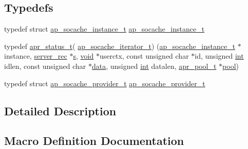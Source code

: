 \subsection*{Typedefs}
\begin{DoxyCompactItemize}
\item 
typedef struct \hyperlink{structap__socache__instance__t}{ap\+\_\+socache\+\_\+instance\+\_\+t} \hyperlink{group__AP__SOCACHE_ga6a099ea28b105424f91cff09d2017acf}{ap\+\_\+socache\+\_\+instance\+\_\+t}
\item 
typedef \hyperlink{group__apr__errno_gaa5105fa83cc322f09382292db8b47593}{apr\+\_\+status\+\_\+t}( \hyperlink{group__AP__SOCACHE_gaacb78747d67eb1ae030a9a5917876b35}{ap\+\_\+socache\+\_\+iterator\+\_\+t}) (\hyperlink{structap__socache__instance__t}{ap\+\_\+socache\+\_\+instance\+\_\+t} $\ast$instance, \hyperlink{structserver__rec}{server\+\_\+rec} $\ast$\hyperlink{pcretest_8txt_a062597889ba244b72877454b1d3adecf}{s}, \hyperlink{group__MOD__ISAPI_gacd6cdbf73df3d9eed42fa493d9b621a6}{void} $\ast$userctx, const unsigned char $\ast$id, unsigned \hyperlink{pcre_8txt_a42dfa4ff673c82d8efe7144098fbc198}{int} idlen, const unsigned char $\ast$\hyperlink{structdata}{data}, unsigned \hyperlink{pcre_8txt_a42dfa4ff673c82d8efe7144098fbc198}{int} datalen, \hyperlink{structapr__pool__t}{apr\+\_\+pool\+\_\+t} $\ast$\hyperlink{group__APR__XLATE_gabb3cd978f04c73d0b763c391e9bfde73}{pool})
\item 
typedef struct \hyperlink{structap__socache__provider__t}{ap\+\_\+socache\+\_\+provider\+\_\+t} \hyperlink{group__AP__SOCACHE_ga15042cdae2fbd908205336d6e43df199}{ap\+\_\+socache\+\_\+provider\+\_\+t}
\end{DoxyCompactItemize}


\subsection{Detailed Description}


\subsection{Macro Definition Documentation}
